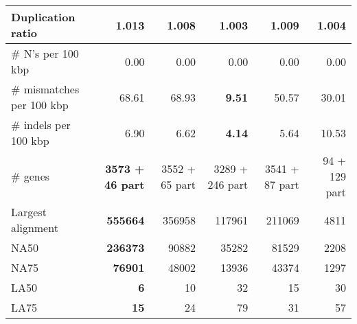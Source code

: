\documentclass[12pt,a4paper]{article}
\begin{document}
\begin{table}[ht]
\begin{center}
\begin{tabular}{|l*{5}{|r}|}
Duplication ratio & 1.013 & 1.008 & {\bf 1.003} & 1.009 & 1.004 \\ \hline
\# N's per 100 kbp & 0.00 & 0.00 & 0.00 & 0.00 & 0.00 \\ \hline
\# mismatches per 100 kbp & 68.61 & 68.93 & {\bf 9.51} & 50.57 & 30.01 \\ \hline
\# indels per 100 kbp & 6.90 & 6.62 & {\bf 4.14} & 5.64 & 10.53 \\ \hline
\# genes & {\bf 3573 + 46 part} & 3552 + 65 part & 3289 + 246 part & 3541 + 87 part & 94 + 129 part \\ \hline
Largest alignment & {\bf 555664} & 356958 & 117961 & 211069 & 4811 \\ \hline
NA50 & {\bf 236373} & 90882 & 35282 & 81529 & 2208 \\ \hline
NA75 & {\bf 76901} & 48002 & 13936 & 43374 & 1297 \\ \hline
LA50 & {\bf 6} & 10 & 32 & 15 & 30 \\ \hline
LA75 & {\bf 15} & 24 & 79 & 31 & 57 \\ \hline
\end{tabular}
\end{center}
\end{table}
\end{document}
